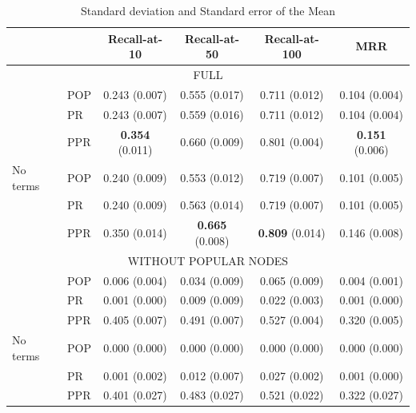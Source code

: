 \documentclass[ijoc,nonblindrev]{informs3} %
\numberwithin{equation}{subsection}
\begin{document}
\begin{table}[!htbp]
\small
\centering
\caption{Standard deviation and Standard error of the Mean}
\label{tab:full}
\begin{tabular}{llcccc} \hline
	& & Recall-at-10 & Recall-at-50 & Recall-at-100 & MRR	 \\
\hline
\multicolumn{6}{c}{FULL} \\
\hline
& POP & 0.243 (0.007) & 0.555 (0.017) & 0.711 (0.012) & 0.104 (0.004) \\
& PR & 	0.243 (0.007) & 0.559 (0.016) & 0.711 (0.012) & 0.104 (0.004) \\
& PPR	& \textbf{0.354}	(0.011) & 0.660	(0.009) & 0.801 (0.004) & \textbf{0.151}	(0.006) \\
\hline
No terms & POP & 0.240 (0.009) & 0.553 (0.012) & 0.719 (0.007) & 0.101 (0.005) \\
& PR & 0.240 (0.009) & 0.563 (0.014) & 0.719 (0.007) & 0.101 (0.005) \\
& PPR	& 0.350	(0.014) & \textbf{0.665}	(0.008) & \textbf{0.809}	(0.014) & 0.146	(0.008) \\
\hline
\hline
\multicolumn{6}{c}{WITHOUT POPULAR NODES} \\
\hline
 & POP & 	0.006 (0.004) & 0.034 (0.009) & 0.065 (0.009) & 0.004 (0.001) \\
 & PR	& 0.001	(0.000) & 0.009	(0.009) & 0.022	(0.003) & 0.001	(0.000) \\
& PPR	& 0.405	(0.007) & 0.491 (0.007) & 0.527	(0.004) & 0.320	(0.005) \\
\hline
No terms & POP & 	0.000 (0.000) & 0.000 (0.000) & 0.000 (0.000) & 0.000 (0.000) \\
& PR & 	0.001 (0.002) & 0.012 (0.007) & 0.027 (0.002) & 0.001 (0.000) \\
& PPR & 	0.401 (0.027) & 0.483 (0.027) & 0.521 (0.022) & 0.322 (0.027) \\
\hline
\hline
\end{tabular}
\end{table}
\end{document}
